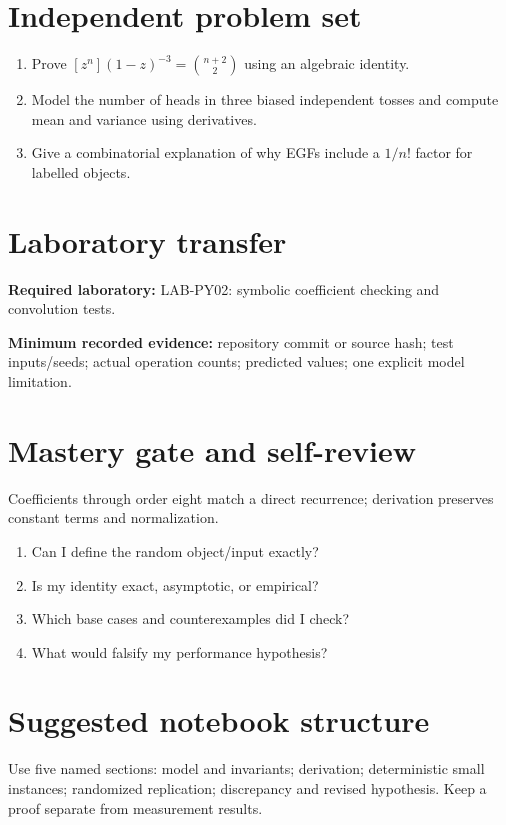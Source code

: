 \documentclass[11pt]{article}
\begin{document}
\section{Independent problem set}
\begin{enumerate}
\item Prove $[z^n](1-z)^{-3}=\binom{n+2}{2}$ using an algebraic identity.
\item Model the number of heads in three biased independent tosses and compute mean and variance using derivatives.
\item Give a combinatorial explanation of why EGFs include a $1/n!$ factor for labelled objects.
\end{enumerate}
\section{Laboratory transfer}
\textbf{Required laboratory:} LAB-PY02: symbolic coefficient checking and convolution tests.\par
\noindent\textbf{Minimum recorded evidence:} repository commit or source hash; test inputs/seeds; actual operation counts; predicted values; one explicit model limitation.\par
\section{Mastery gate and self-review}
Coefficients through order eight match a direct recurrence; derivation preserves constant terms and normalization.\par
\begin{enumerate}\item Can I define the random object/input exactly? \item Is my identity exact, asymptotic, or empirical? \item Which base cases and counterexamples did I check? \item What would falsify my performance hypothesis?\end{enumerate}
\section{Suggested notebook structure}
Use five named sections: model and invariants; derivation; deterministic small instances; randomized replication; discrepancy and revised hypothesis. Keep a proof separate from measurement results.
\end{document}
